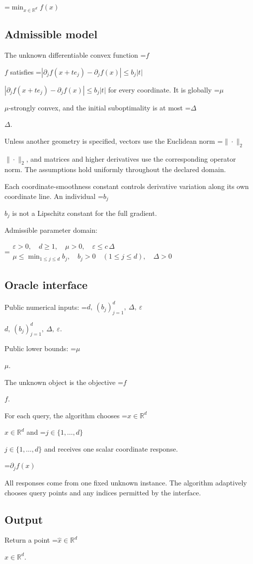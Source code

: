 \documentclass[10pt,a4paper]{article}
\newcommand{\AtlasMath}[1]{\par\begingroup\centering\setbox0=\hbox{$\displaystyle #1$}\ifdim\wd0>1.4\linewidth\typeout{ATLAS WIDE FORMULA: \the\wd0}\fi\ifdim\wd0>\linewidth\resizebox{\linewidth}{!}{\box0}\else\box0\fi\par\endgroup}
\newcommand{\AtlasInlineMath}[1]{\begingroup\setbox0=\hbox{$#1$}\ifdim\wd0>.4\linewidth\endgroup\AtlasMath{#1}\else\endgroup$#1$\fi}
\begin{document}
\AtlasMath{\min_{x\in \mathbb{R}^d}f(x)}


\subsection{Admissible model}
The unknown differentiable convex function \AtlasInlineMath{f} satisfies \AtlasInlineMath{|\partial_jf(x+te_j)-\partial_jf(x)|\le b_j|t|} for every coordinate. It is globally \AtlasInlineMath{\mu}-strongly convex, and the initial suboptimality is at most \AtlasInlineMath{\Delta}.

Unless another geometry is specified, vectors use the Euclidean norm \AtlasInlineMath{\|\cdot\|_2}, and matrices and higher derivatives use the corresponding operator norm. The assumptions hold uniformly throughout the declared domain.

Each coordinate-smoothness constant controls derivative variation along its own coordinate line. An individual \AtlasInlineMath{b_j} is not a Lipschitz constant for the full gradient.

Admissible parameter domain:


\AtlasMath{\begin{gathered}\varepsilon > 0,\quad d \ge 1,\quad \mu > 0,\quad \varepsilon \le c\,\Delta\\\mu\le\min_{1\le j\le d}b_j,\quad b_j>0\quad(1\le j\le d),\quad \Delta > 0\end{gathered}}


\subsection{Oracle interface}
Public numerical inputs: \AtlasInlineMath{d,\ (b_j)_{j=1}^d,\ \Delta,\ \varepsilon}.

Public lower bounds: \AtlasInlineMath{\mu}.

The unknown object is the objective \AtlasInlineMath{f}.

For each query, the algorithm chooses \AtlasInlineMath{x\in\mathbb R^d} and \AtlasInlineMath{j\in\{1,\ldots,d\}} and receives one scalar coordinate response.


\AtlasMath{\partial_j f(x)}


All responses come from one fixed unknown instance. The algorithm adaptively chooses query points and any indices permitted by the interface.

\subsection{Output}
Return a point \AtlasInlineMath{\widehat x\in\mathbb R^d}.
\end{document}

